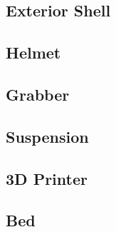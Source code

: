 \subsection{Exterior Shell} \label{sec:WorkingDrawingExteriorShell}

\clearpage
\subsection{Helmet} \label{sec:WorkingDrawingHelmet}

\clearpage
\subsection{Grabber} \label{sec:WorkingDrawingGrabber}

\clearpage
\subsection{Suspension} \label{sec:WorkingDrawingSuspension}

\clearpage
\subsection{3D Printer} \label{sec:WorkingDrawing3DPrinter}

\clearpage
\subsection{Bed} \label{sec:WorkingDrawingBed}




